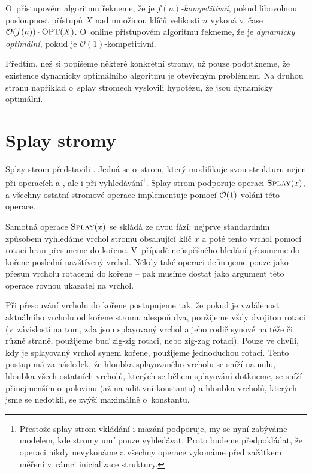 \begin{definice}
O~přístupovém algoritmu řekneme, že je \emph{$f(n)$-kompetitivní}, pokud libovolnou
posloupnost přístupů $X$ nad množinou klíčů velikosti $n$ vykoná v~čase $
\mathcal O(f(n))\cdot\operatorname{OPT}(X)$. O~online přístupovém algoritmu řekneme, že je
\emph{dynamicky optimální}, pokud je $\mathcal O(1)$-kompetitivní.
\end{definice}

Předtím, než si popíšeme některé konkrétní stromy, už pouze podotkneme, že
existence dynamicky optimálního algoritmu je otevřeným problémem. Na druhou
stranu například o~splay stromech vyslovili \citet{splay} hypotézu, že jsou
dynamicky optimální.

\section{Splay stromy}

Splay strom představili \citet{splay}. Jedná se o~strom, který modifikuje svou
strukturu nejen při operacích  a , ale i při
vyhledávání\footnote{Přestože splay strom vkládání i mazání podporuje, my se
nyní zabýváme modelem, kde stromy umí pouze vyhledávat. Proto budeme
předpokládat, že operaci  nikdy nevykonáme a všechny operace
 vykonáme před začátkem měření v~rámci inicializace struktury.}.
Splay strom podporuje operaci $\ope{Splay}(x)$, a všechny ostatní stromové
operace implementuje pomocí $\mathcal O(1)$ volání této operace.

Samotná operace $\ope{Splay}(x)$ se skládá ze dvou fází: nejprve standardním způsobem
vyhledáme vrchol stromu obsahující klíč $x$ a poté tento vrchol pomocí rotací
hran přesuneme do kořene. V~případě neúspěšného hledání přesuneme do kořene poslední navštívený vrchol. Někdy také operaci  definujeme pouze jako přesun vrcholu rotacemi do kořene -- pak musíme dostat jako argument této operace rovnou ukazatel na vrchol.

Při přesouvání vrcholu do kořene postupujeme tak, že
pokud je vzdálenost aktuálního vrcholu od kořene stromu alespoň dva, použijeme
vždy dvojitou rotaci (v~závislosti na tom, zda jsou splayovaný vrchol a jeho
rodič synové na téže či různé straně, použijeme buď zig-zig rotaci, nebo zig-zag
rotaci). Pouze ve chvíli, kdy je splayovaný vrchol synem kořene, použijeme
jednoduchou rotaci. Tento postup má za následek, že hloubka splayovaného vrcholu se sníží na nulu, hloubka všech ostatních vrcholů, kterých se během splayování dotkneme, se sníží přinejmenším o~polovinu (až na aditivní konstantu) a hloubka vrcholů, kterých jsme se nedotkli, se zvýší maximálně o~konstantu.

